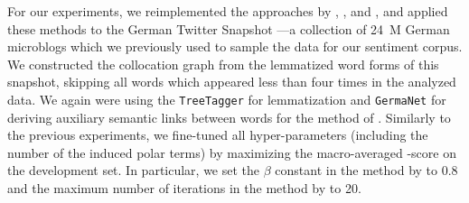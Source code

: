 For our experiments, we reimplemented the approaches by
\citet{Takamura:05}, \citet{Velikovich:10}, \citet{Kiritchenko:14} and
\citet{Severyn:15}, and applied these methods to the German Twitter
Snapshot \cite{Scheffler:14}---a collection of 24~M German microblogs
which we previously used to sample the data for our sentiment corpus.
We constructed the collocation graph from the lemmatized word forms of
this snapshot, skipping all words which appeared less than four times
in the analyzed data.  We again were using the \texttt{TreeTagger}
\cite{Schmid:95} for lemmatization and \texttt{GermaNet} for deriving
auxiliary semantic links between words for the method of
\citet{Takamura:05}.  Similarly to the previous experiments, we
fine-tuned all hyper-parameters (including the number of the induced
polar terms) by maximizing the macro-averaged \F{}-score on the
development set.  In particular, we set the $\beta$ constant in the
method by \citet{Takamura:05} to 0.8 and the maximum number of
iterations in the method by \citet{Velikovich:10} to 20.



